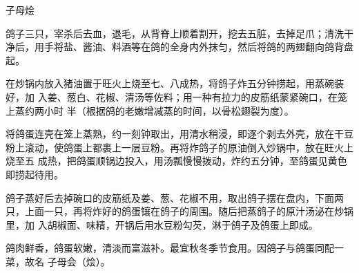\begin{recipe}{子母烩}

\ingredients


\preparation

\step 鸽子三只，宰杀后去血，退毛，从背脊上顺着割开，挖去五脏，去掉足爪；清洗干
净后，用手将盐、酱油、料酒等在鸽的全身内外抹匀，然后将鸽的两翅翻向鸽背盘起。

在炒锅内放入猪油置于旺火上烧至七、八成热，将鸽子炸五分钟捞起，用蒸碗装好，加
入姜、葱白、花椒、清汤等佐料；用一种有拉力的皮筋纸蒙紧碗口，在笼上蒸约两小时
半（根据鸽的老嫩增减蒸的时间，以骨松翅裂为度）。

\step 将鸽蛋连壳在笼上蒸熟，约一刻钟取出，用清水稍浸，即逐个剥去外壳，放在干豆
粉上滚动，使鸽蛋上都裹上一层豆粉。再将炸鸽子的原油倒入炒锅中，放在旺火上烧至五
成热，把鸽蛋顺锅边投入，用汤瓢慢慢拨动，炸约五分钟，至鸽蛋见黄色即捞起待用。

\step 鸽子蒸好后去掉碗口的皮筋纸及姜、葱、花椒不用，取出鸽子摆在盘内，下面两
只，上面一只，再将炸好的鸽蛋镶在鸽子的周围。随后把蒸鸽子的原汁汤泌在炒锅里，加
入胡椒面、味精，开锅后用水豆粉勾芡，淋于鸽子及鸽蛋上即成。

\features

鸽肉鲜香，鸽蛋软嫩，清淡而富滋补。最宜秋冬季节食用。因鸽子与鸽蛋同配一菜，故名
子母会（烩）。

\end{recipe}

